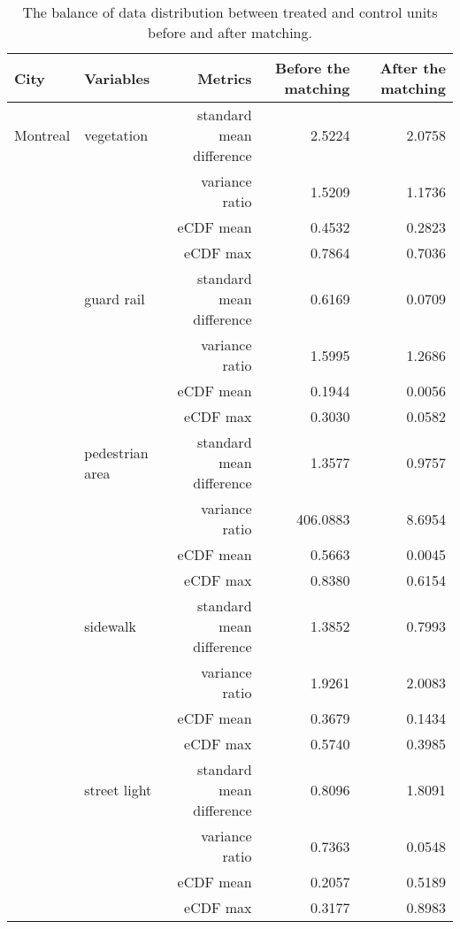 \begin{table}[!htp]\centering
\caption{The balance of data distribution between treated and control units before and after matching.}\label{result:tab:match_result}
\scriptsize
\begin{tabular}{llrrr}\toprule
City&Variables&Metrics&Before the matching &After the matching \\\midrule

Montreal & vegetation & standard mean difference & 2.5224 & \cellcolor{customgreen} 2.0758 \\
 &  & variance ratio & 1.5209 & \cellcolor{customgreen} 1.1736 \\
 &  & eCDF mean & 0.4532 & \cellcolor{customgreen} 0.2823 \\
 &  & eCDF max & 0.7864 & \cellcolor{customgreen} 0.7036 \\
 & guard rail & standard mean difference & 0.6169 & \cellcolor{customgreen} 0.0709 \\
 &  & variance ratio & 1.5995 & \cellcolor{customgreen} 1.2686 \\
 &  & eCDF mean & 0.1944 & \cellcolor{customgreen} 0.0056 \\
 &  & eCDF max & 0.3030 & \cellcolor{customgreen} 0.0582 \\
 & pedestrian area & standard mean difference & 1.3577 & \cellcolor{customgreen} 0.9757 \\
 &  & variance ratio & 406.0883 & \cellcolor{customgreen} 8.6954 \\
 &  & eCDF mean & 0.5663 & \cellcolor{customgreen} 0.0045 \\
 &  & eCDF max & 0.8380 & \cellcolor{customgreen} 0.6154 \\
 & sidewalk & standard mean difference & 1.3852 & \cellcolor{customgreen} 0.7993 \\
 &  & variance ratio & 1.9261 & \cellcolor{custompurple} 2.0083 \\
 &  & eCDF mean & 0.3679 & \cellcolor{customgreen} 0.1434 \\
 &  & eCDF max & 0.5740 & \cellcolor{customgreen} 0.3985 \\
 & street light & standard mean difference & 0.8096 & \cellcolor{custompurple} 1.8091 \\
 &  & variance ratio & 0.7363 & \cellcolor{custompurple} 0.0548 \\
 &  & eCDF mean & 0.2057 & \cellcolor{custompurple} 0.5189 \\
 &  & eCDF max & 0.3177 & \cellcolor{custompurple} 0.8983 \\

\end{tabular}
\end{table}
